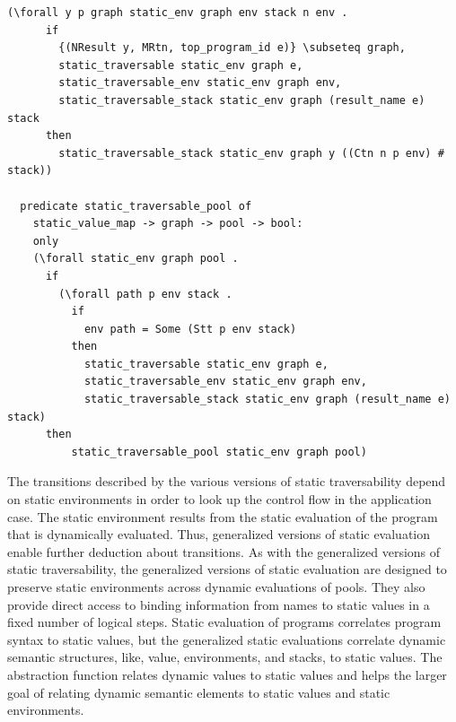 \documentclass[10pt]{article}
\begin{document}
\begin{lstlisting}[language=logic, mathescape]
    (\forall y p graph static_env graph env stack n env .
      if 
        {(NResult y, MRtn, top_program_id e)} \subseteq graph,
        static_traversable static_env graph e,
        static_traversable_env static_env graph env,
        static_traversable_stack static_env graph (result_name e) stack 
      then 
        static_traversable_stack static_env graph y ((Ctn n p env) # stack))

  predicate static_traversable_pool of
    static_value_map -> graph -> pool -> bool:
    only
    (\forall static_env graph pool .
      if
        (\forall path p env stack .
          if
            env path = Some (Stt p env stack)
          then 
            static_traversable static_env graph e, 
            static_traversable_env static_env graph env, 
            static_traversable_stack static_env graph (result_name e) stack) 
      then
          static_traversable_pool static_env graph pool)
  \end{lstlisting}

The transitions described by the various versions of static traversability depend on static
environments in order to look up the control flow in the application case.
The static environment
results from the static evaluation of the program that is dynamically evaluated. Thus,
generalized
versions of static evaluation enable further deduction about transitions.
As with the generalized versions of static traversability,
the generalized versions of static evaluation are designed to
preserve static environments across
dynamic evaluations of pools. They also provide direct access to binding information from names
to static values in a fixed number of logical steps. Static evaluation of programs correlates
program syntax to static values, but the generalized static evaluations correlate dynamic
semantic structures, like, value, environments, and stacks, to static values. The abstraction
function relates dynamic values to static values and helps the larger goal of relating dynamic
semantic elements to static values and static environments.    
\end{document}
